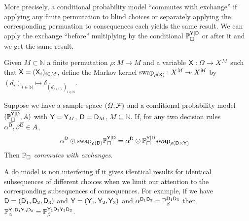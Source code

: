 More precisely, a conditional probability model ``commutes with exchange'' if applying any finite permutation to blind choices or separately applying the corresponding permuation to consequences each yields the same result. We can apply the exchange ``before'' multiplying by the conditional $\mathbb{P}_{\square}^{\mathsf{Y}|\mathsf{D}}$ or after it and we get the same result.

\begin{definition}
Given $M\subset \mathbb{N}$ a finite permutation $\rho:M\to M$ and a variable $\mathsf{X}:\Omega\to X^M$ such that $\mathsf{X}=(\mathsf{X}_i)_{i\in M}$, define the Markov kernel $\text{swap}_{\rho(\mathsf{X})}:X^M\rightarrowtriangle X^M$ by $(d_i)_{i\in\mathbb{N}}\mapsto \delta_{(d_{\rho(i)})_{i\in\mathbb{N}}}$.
\end{definition}

\begin{definition}\label{def:caus_exch}
Suppose we have a sample space $(\Omega,\mathcal{F})$ and a conditional probability model $(\mathbb{P}_{\square}^{\overline{\mathsf{Y}|\mathsf{D}}},A)$ with $\mathsf{Y}=\mathsf{Y}_M$, $\mathsf{D}=\mathsf{D}_M$, $M\subseteq \mathbb{N}$. If, for any two decision rules $\alpha^{\overline{\mathsf{D}}},\beta^{\overline{\mathsf{D}}} \in A$,
\begin{align}
    \alpha^{\mathsf{D}}\odot \text{swap}_{\rho(\mathsf{D})} \mathbb{P}_{\square}^{\mathsf{Y}|\mathsf{D}} &= \alpha^{\mathsf{D}}\odot \mathbb{P}_{\square}^{\mathsf{Y}|\mathsf{D}}\text{swap}_{\rho(\mathsf{D}\times \mathsf{Y})}
\end{align}
Then $\mathbb{P}_\square$ \emph{commutes with exchanges}.
\end{definition}

A do model is non interfering if it gives identical results for identical subsequences of different choices when we limit our attention to the corresponding subsequences of consequences. For example, if we have $\mathsf{D}=(\mathsf{D}_1,\mathsf{D}_2,\mathsf{D}_3)$ and $\mathsf{Y}=(\mathsf{Y}_1,\mathsf{Y}_2,\mathsf{Y}_3)$ and $\alpha^{\mathsf{D}_1\mathsf{D}_3}=\mathbb{P}_\beta^{\mathsf{D}_1\mathsf{D}_3}$ then $\mathbb{P}_{\alpha}^{\mathsf{Y}_1\mathsf{D}_1\mathsf{Y}_3\mathsf{D}_3}=\mathbb{P}_\beta^{\mathsf{Y}_1\mathsf{D}_1\mathsf{Y}_3\mathsf{D}_3}$.

